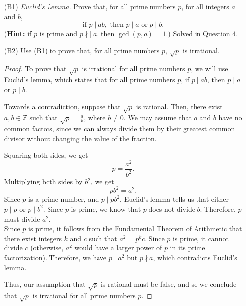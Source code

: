 \documentclass{article}
\begin{document}
    \begin{itemize}

    	\item [(B1)] \emph{Euclid's Lemma.} Prove that, for all prime numbers $p$, for all integers $a$ and $b$,
    		\[
    			\text{if } p \mid ab, \text{ then } p \mid a \text{ or } p \mid b.
    		\]
    		(\textbf{Hint:} if $p$ is prime and $p\nmid|\ a$, then $\gcd(p,a) = 1$.)
                \ppar Solved in Question 4.

    	\item [(B2)] Use (B1) to prove that, for all prime numbers $p$, $\sqrt{p}$ is irrational.
                \begin{proof}
                    To prove that $\sqrt{p}$ is irrational for all prime numbers $p$, we will use Euclid's lemma, which states that for all prime numbers $p$, if $p \mid ab$, then $p \mid a$ or $p \mid b$.

                    Towards a contradiction, suppose that $\sqrt{p}$ is rational. Then, there exist $a, b\in\mathbb{Z}$ such that $\sqrt{p}=\frac{a}{b}$, where $b\neq0$. We may assume that $a$ and $b$ have no common factors, since we can always divide them by their greatest common divisor without changing the value of the fraction.

                    Squaring both sides, we get 
                    \[
                        p = \frac{a^2}{b^2}.
                    \]
                    Multiplying both sides by $b^2$, we get
                    \[
                        pb^2 = a^2.
                    \]
                    Since $p$ is a prime number, and $p \mid pb^2$, Euclid's lemma tells us that either $p \mid p$ or $p \mid b^2$. Since $p$ is prime, we know that $p$ does not divide $b$. Therefore, $p$ must divide $a^2$.\\

                    Since $p$ is prime, it follows from the Fundamental Theorem of Arithmetic that there exist integers $k$ and $c$ such that $a^2 = p^kc$. Since $p$ is prime, it cannot divide $c$ (otherwise, $a^2$ would have a larger power of $p$ in its prime factorization). Therefore, we have $p \mid a^2$ but $p\nmid a$, which contradicts Euclid's lemma.

                    Thus, our assumption that $\sqrt{p}$ is rational must be false, and so we conclude that $\sqrt{p}$ is irrational for all prime numbers $p$.
                \end{proof}
    \end{itemize}
    
\end{document}
